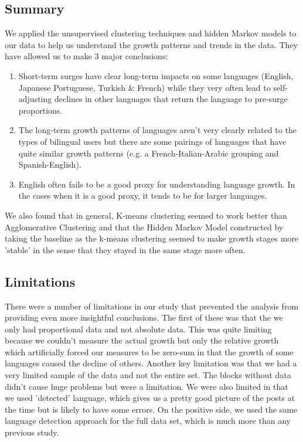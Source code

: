 \documentclass[12pt]{article}
\begin{document}
\subsection{Summary}
We applied the unsupervised clustering techniques and hidden Markov models to our data to help us understand the growth patterns and trends in the data. They have allowed us to make 3 major conclusions:
\begin{enumerate}
\item Short-term surges have clear long-term impacts on some languages (English, Japanese Portuguese, Turkish \& French) while they very often lead to self-adjusting declines in other languages that return the language to pre-surge proportions.
\item The long-term growth patterns of languages aren't very clearly related to the types of bilingual users but there are some pairings of languages that have quite similar growth patterns (e.g. a French-Italian-Arabic grouping and Spanish-English).
\item English often fails to be a good proxy for understanding language growth. In the cases when it is a good proxy, it tends to be for larger languages.
\end{enumerate}
We also found that in general, K-means clustering seemed to work better than Agglomerative Clustering and that the Hidden Markov Model constructed by taking the baseline as the k-means clustering seemed to make growth stages more 'stable' in the sense that they stayed in the same stage more often.
\subsection{Limitations}
There were a number of limitations in our study that prevented the analysis from providing even more insightful conclusions. The first of these was that the we only had proportional data and not absolute data. This was quite limiting because we couldn't measure the actual growth but only the relative growth which artificially forced our measures to be zero-sum in that the growth of some languages caused the decline of others. Another key limitation was that we had a very limited sample of the data and not the entire set. The blocks without data didn't cause huge problems but were a limitation. We were also limited in that we used 'detected' language, which gives us a pretty good picture of the posts at the time but is likely to have some errors. On the positive side, we used the same language detection approach for the full data set, which is much more than any previous study.
\end{document}

